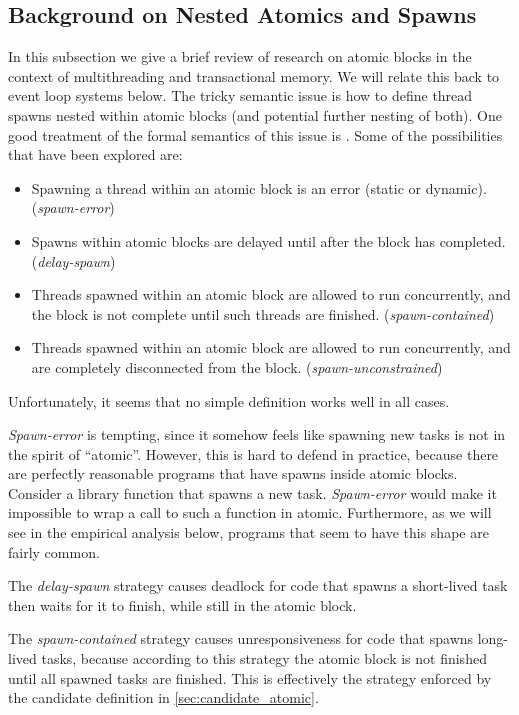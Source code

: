\documentclass[acmsmall,anonymous,review]{acmart}\settopmatter{printfolios=true,printccs=false,printacmref=false}
\begin{document}
\subsection{Background on Nested Atomics and Spawns}

In this subsection we give a brief review of research on atomic blocks in the context of multithreading and transactional memory.
We will relate this back to event loop systems below.
The tricky semantic issue is how to define thread spawns nested within atomic blocks (and potential further nesting of both).
One good treatment of the formal semantics of this issue is \cite{Moore2008}.
Some of the possibilities that have been explored are:
\begin{itemize}
\item Spawning a thread within an atomic block is an error (static or dynamic). (\emph{spawn-error})
\item Spawns within atomic blocks are delayed until after the block has completed. (\emph{delay-spawn})
\item Threads spawned within an atomic block are allowed to run concurrently, and the block is not complete until such threads are finished. (\emph{spawn-contained})
\item Threads spawned within an atomic block are allowed to run concurrently, and are completely disconnected from the block. (\emph{spawn-unconstrained})
\end{itemize}

Unfortunately, it seems that no simple definition works well in all cases.

\emph{Spawn-error} is tempting, since it somehow feels like spawning new tasks is not in the spirit of ``atomic''.
However, this is hard to defend in practice, because there are perfectly reasonable programs that have spawns inside atomic blocks.
Consider a library function that spawns a new task.
\emph{Spawn-error} would make it impossible to wrap a call to such a function in atomic.
Furthermore, as we will see in the empirical analysis below, programs that seem to have this shape are fairly common.

The \emph{delay-spawn} strategy causes deadlock for code that spawns a short-lived task then waits for it to finish, while still in the atomic block.

The \emph{spawn-contained} strategy causes unresponsiveness for code that spawns long-lived tasks, because according to this strategy the atomic block is not finished until all spawned tasks are finished.
This is effectively the strategy enforced by the candidate definition in \textsection\ref{sec:candidate_atomic}.
\end{document}
